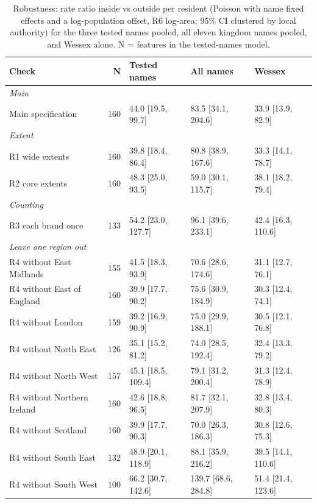 \documentclass[11pt,a4paper]{article}
\begin{document}
\begin{table}[tbp]\centering\scriptsize\caption{Robustness: rate ratio inside vs outside per resident (Poisson with name fixed effects and a log-population offset, R6 log-area; 95\% CI clustered by local authority) for the three tested names pooled, all eleven kingdom names pooled, and Wessex alone. N = features in the tested-names model.}\label{tab:robust}\setlength{\tabcolsep}{3pt}\begin{tabular}{p{6.2cm}rlll}\toprule Check & N & Tested names & All names & Wessex\\\midrule
\multicolumn{4}{l}{\textit{Main}}\\
\quad Main specification & 160 & 44.0 [19.5, 99.7] & 83.5 [34.1, 204.6] & 33.9 [13.9, 82.9]\\
\multicolumn{4}{l}{\textit{Extent}}\\
\quad R1 wide extents & 160 & 39.8 [18.4, 86.4] & 80.8 [38.9, 167.6] & 33.3 [14.1, 78.7]\\
\quad R2 core extents & 160 & 48.3 [25.0, 93.5] & 59.0 [30.1, 115.7] & 38.1 [18.2, 79.4]\\
\multicolumn{4}{l}{\textit{Counting}}\\
\quad R3 each brand once & 133 & 54.2 [23.0, 127.7] & 96.1 [39.6, 233.1] & 42.4 [16.3, 110.6]\\
\multicolumn{4}{l}{\textit{Leave one region out}}\\
\quad R4 without East Midlands & 155 & 41.5 [18.3, 93.9] & 70.6 [28.6, 174.6] & 31.1 [12.7, 76.1]\\
\quad R4 without East of England & 160 & 39.9 [17.7, 90.2] & 75.6 [30.9, 184.9] & 30.3 [12.4, 74.1]\\
\quad R4 without London & 159 & 39.2 [16.9, 90.9] & 75.0 [29.9, 188.1] & 30.5 [12.1, 76.8]\\
\quad R4 without North East & 126 & 35.1 [15.2, 81.2] & 74.0 [28.5, 192.4] & 32.4 [13.3, 79.2]\\
\quad R4 without North West & 157 & 45.1 [18.5, 109.4] & 79.1 [31.2, 200.4] & 31.3 [12.4, 78.9]\\
\quad R4 without Northern Ireland & 160 & 42.6 [18.8, 96.5] & 81.7 [32.1, 207.9] & 32.8 [13.4, 80.3]\\
\quad R4 without Scotland & 160 & 39.9 [17.7, 90.3] & 70.0 [26.3, 186.3] & 30.8 [12.6, 75.3]\\
\quad R4 without South East & 132 & 48.9 [20.1, 118.9] & 88.1 [35.9, 216.2] & 39.5 [14.1, 110.6]\\
\quad R4 without South West & 100 & 66.2 [30.7, 142.6] & 139.7 [68.6, 284.8] & 51.4 [21.4, 123.6]\\

\end{tabular}
\end{table}
\end{document}
